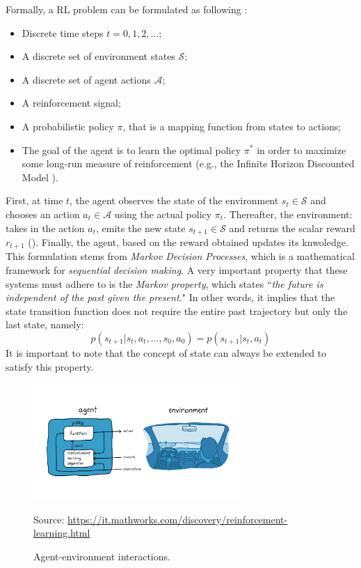 \documentclass[12pt,a4paper,openright,twoside]{book}
\newcommand{\fonte}[1]{{\color{gray} \small \hypersetup{citecolor=gray} Source: #1}}
\begin{document}
Formally, a RL problem can be formulated as following \cite{RLSurvey}:
    \begin{itemize}
        \item Discrete time steps $t=0, 1, 2, ...$;
        \item A discrete set of environment states $\mathcal{S}$;
        \item A discrete set of agent actions $\mathcal{A}$;
        \item A reinforcement signal;
        \item A probabilistic policy $\pi$, that is a mapping function from states to actions;
        \item The goal of the agent is to learn the optimal policy $\pi^*$ in order to maximize 
                some long-run measure of reinforcement (e.g., the Infinite Horizon Discounted Model \cite{RLSurvey}).
    \end{itemize}
    First, at time $t$, the agent observes the state of the environment $s_t \in \mathcal{S}$
        and chooses an action $a_t \in \mathcal{A}$ using the actual policy $\pi_t$. 
        Thereafter, the environment: takes in the action $a_t$, emits the new state $s_{t+1} \in \mathcal{S}$ 
        and returns the scalar reward $r_{t+1}$ ().
        Finally, the agent, based on the reward obtained updates its knwoledge.
    This formulation stems from \emph{Markov Decision Processes}, which is a mathematical framework for \emph{sequential decision making}. A very important property that these systems must adhere to is the \emph{Markov property}, which states ``\emph{the future is independent of the past given the present.}" In other words, it implies that the state transition function does not require the entire past trajectory but only the last state, namely: 
    $$p(s_{t+1} | s_t, a_t, ..., s_0, a_0) = p(s_{t+1} | s_t, a_t)$$
    It is important to note that the concept of state can always be extended to satisfy this property.


\begin{figure}[t]
    \centering
    \includegraphics[width=0.7\textwidth]{figures/rl.png}
    \caption{Agent-environment interactions.}
    \fonte{\url{https://it.mathworks.com/discovery/reinforcement-learning.html}}
    \label{fig:rl_schema}
\end{figure}
\end{document}
